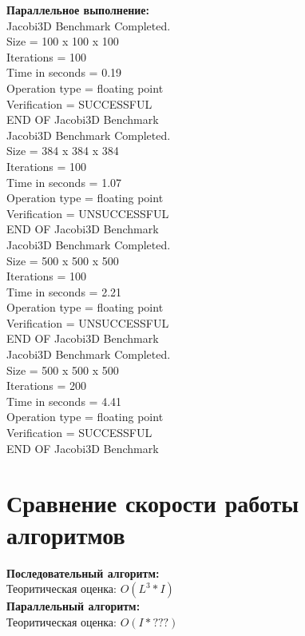 \documentclass[a4paper,12pt,titlepage,draft]{article}
\begin{document}
\begin{minipage}{.45\textwidth}
\textbf{Параллельное выполнение:}\\

 Jacobi3D Benchmark Completed.\\
 Size            =  100 x  100 x  100\\
 Iterations      =                100\\
 Time in seconds =               0.19\\
 Operation type  =     floating point\\
 Verification    =         SUCCESSFUL\\
 END OF Jacobi3D Benchmark\\

Jacobi3D Benchmark Completed.\\
 Size            =  384 x  384 x  384\\
 Iterations      =                100\\
 Time in seconds =               1.07\\
 Operation type  =     floating point\\
 Verification    =       UNSUCCESSFUL\\
 END OF Jacobi3D Benchmark\\

 Jacobi3D Benchmark Completed.\\
 Size            =  500 x  500 x  500\\
 Iterations      =                100\\
 Time in seconds =               2.21\\
 Operation type  =     floating point\\
 Verification    =       UNSUCCESSFUL\\
 END OF Jacobi3D Benchmark\\

 Jacobi3D Benchmark Completed.\\
 Size            =  500 x  500 x  500\\
 Iterations      =                200\\
 Time in seconds =               4.41\\
 Operation type  =     floating point\\
 Verification    =         SUCCESSFUL\\
 END OF Jacobi3D Benchmark\\

\end{minipage}

\newpage
\section{Сравнение скорости работы алгоритмов}
\textbf{Последовательный алгоритм:}\\

Теоритическая оценка: $O(L^3 * I)$\\

\textbf{Параллельный алгоритм:}\\

Теоритическая оценка: $O(I * ???)$
\end{document}
